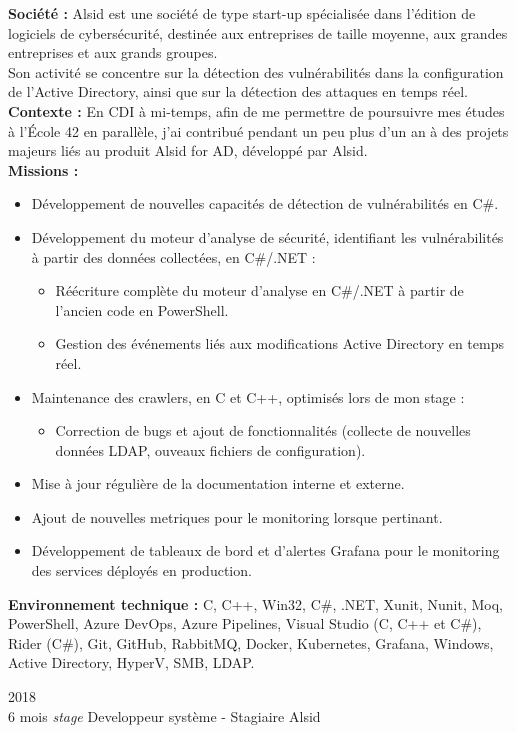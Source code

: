 \documentclass[8pt]{developercv} %
\begin{document}
\textbf{Société :} Alsid est une société de type start-up spécialisée dans l'édition de logiciels de cybersécurité, destinée aux entreprises de taille moyenne, aux grandes entreprises et aux grands groupes.\\
Son activité se concentre sur la détection des vulnérabilités dans la configuration de l'Active Directory, ainsi que sur la détection des attaques en temps réel.\\

\textbf{Contexte :} En CDI à mi-temps, afin de me permettre de poursuivre mes études à l'École 42 en parallèle, j'ai contribué pendant un peu plus d'un an à des projets majeurs liés au produit Alsid for AD, développé par Alsid.\\

\textbf{Missions :}
\begin{itemize}
    \item Développement de nouvelles capacités de détection de vulnérabilités en C\#.
    \item Développement du moteur d'analyse de sécurité, identifiant les vulnérabilités à partir des données collectées, en C\#/.NET :
        \begin{itemize}
            \item Réécriture complète du moteur d'analyse en C\#/.NET à partir de l'ancien code en PowerShell.
            \item Gestion des événements liés aux modifications Active Directory en temps réel.
        \end{itemize}
    \item Maintenance des crawlers, en C et C++, optimisés lors de mon stage :
        \begin{itemize}
            \item Correction de bugs et ajout de fonctionnalités (collecte de nouvelles données LDAP, ouveaux fichiers de configuration).
        \end{itemize}
    \item Mise à jour régulière de la documentation interne et externe.
    \item Ajout de nouvelles metriques pour le monitoring lorsque pertinant.
    \item Développement de tableaux de bord et d'alertes Grafana pour le monitoring des services déployés en production.
\end{itemize}
\vspace{\baselineskip}
\textbf{Environnement technique :} C, C++, Win32, C\#, .NET, Xunit, Nunit, Moq, PowerShell, Azure DevOps, Azure Pipelines, Visual Studio (C, C++ et C\#), Rider (C\#), Git, GitHub, RabbitMQ, Docker, Kubernetes, Grafana, Windows, Active Directory, HyperV, SMB, LDAP.\\
\vspace{\baselineskip}
\begin{entrylisthrules}
    \entry
    {2018\\\footnotesize{6 mois \emph{stage}}}
    {Developpeur système  - Stagiaire}
    {Alsid}
    {}
\end{entrylisthrules}
\end{document}
